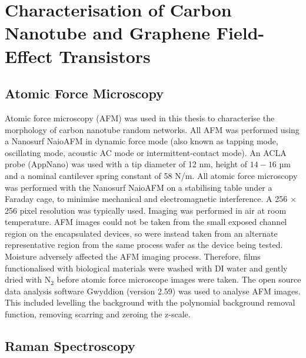 \documentclass[
  a4paper,
]{scrbook}
\begin{document}
\hypertarget{characterisation-of-carbon-nanotube-and-graphene-field-effect-transistors}{%
\section{Characterisation of Carbon Nanotube and Graphene Field-Effect
Transistors}\label{characterisation-of-carbon-nanotube-and-graphene-field-effect-transistors}}

\hypertarget{sec-afm-characterisation}{%
\subsection{Atomic Force Microscopy}\label{sec-afm-characterisation}}

Atomic force microscopy (AFM) was used in this thesis to characterise
the morphology of carbon nanotube random networks. All AFM was performed
using a Nanosurf NaioAFM in dynamic force mode (also known as tapping
mode, oscillating mode, acoustic AC mode or intermittent-contact mode).
An ACLA probe (AppNano) was used with a tip diameter of 12 nm, height of
\(14-16\) µm and a nominal cantilever spring constant of 58 N/m. All
atomic force microscopy was performed with the Nanosurf NaioAFM on a
stabilising table under a Faraday cage, to minimise mechanical and
electromagnetic interference. A 256 \(\times\) 256 pixel resolution was
typically used. Imaging was performed in air at room temperature. AFM
images could not be taken from the small exposed channel region on the
encapsulated devices, so were instead taken from an alternate
representative region from the same process wafer as the device being
tested. Moisture adversely affected the AFM imaging process. Therefore,
films functionalised with biological materials were washed with DI water
and gently dried with N\(_2\) before atomic force microscope images were
taken. The open source data analysis software Gwyddion (version 2.59)
was used to analyse AFM images. This included levelling the background
with the polynomial background removal function, removing scarring and
zeroing the z-scale.

\hypertarget{sec-raman-characterisation}{%
\subsection{Raman Spectroscopy}\label{sec-raman-characterisation}}
\end{document}
